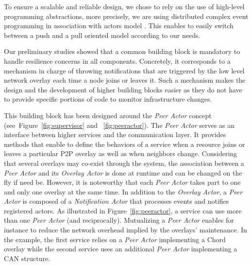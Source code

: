 To ensure a scalable and reliable design, we  chose to rely on the use
of high-level programming abstractions, more precisely, we are using distributed
complex event programming \cite{janiesch:2011} in association with actors
model \cite{agha:1986}. This enables to easily switch between a push and a pull
oriented model according to our needs. 

Our preliminary studies showed that a common building block is mandatory to
handle resilience concerns in all components. Concretely, it corresponds to a
mechanism in charge of throwing notifications that are triggered by the low
level network overlay each time a node joins or leaves it.  Such a mechanism
makes the design and the development of higher building blocks easier as they do
not have to provide specific portions of code to monitor infrastructure
changes. 

This building block has been designed around the \emph{Peer Actor} concept (see~Figure~\ref{fig:supervisor} and
~\ref{fig:peeractor}).
 The \emph{Peer Actor} serves as an interface between higher services
and the communication layer. It provides methods that enable to define the behaviors of a
service when a resource joins or leaves a particular P2P overlay as well as
when neighbors change.
Considering that several overlays may co-exist through the \discovery system, 
the association between a \emph{Peer Actor} and its \emph{Overlay Actor} is
done at runtime and can be changed on the fly if need be. However, it is noteworthy that 
each \emph{Peer Actor} takes part to one and only one overlay at the same time.  
%
In addition to the \emph{Overlay Actor}, a \emph{Peer Actor}  is composed of a
\emph{Notification Actor}  that processes events and notifies registered actors.
%
As illustrated in Figure~\ref{fig:peeractor}, a service can use more than one \emph{Peer Actor} (and reciprocally). 
Mutualizing a \emph{Peer Actor} enables for instance to reduce the network overhead implied by the overlays' maintenance. 
In the example, the first service relies on a \emph{Peer Actor} implementing a Chord
overlay while the second service uses an additional \emph{Peer Actor} implementing a CAN structure.
 
